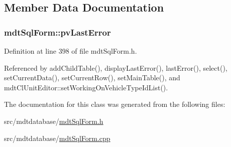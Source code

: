 \subsection{Member Data Documentation}
\hypertarget{classmdt_sql_form_afc24e8dedd1249a29708347fdff560fd}{
\subsubsection[{pv\-Last\-Error}]{ mdt\-Sql\-Form\-::pv\-Last\-Error\hspace{0.3cm}{\ttfamily [protected]}}}\label{classmdt_sql_form_afc24e8dedd1249a29708347fdff560fd}


Definition at line 398 of file mdt\-Sql\-Form.\-h.



Referenced by add\-Child\-Table(), display\-Last\-Error(), last\-Error(), select(), set\-Current\-Data(), set\-Current\-Row(), set\-Main\-Table(), and mdt\-Cl\-Unit\-Editor\-::set\-Working\-On\-Vehicle\-Type\-Id\-List().



The documentation for this class was generated from the following files\-:\begin{DoxyCompactItemize}
\item 
src/mdtdatabase/\hyperlink{mdt_sql_form_8h}{mdt\-Sql\-Form.\-h}\item 
src/mdtdatabase/\hyperlink{mdt_sql_form_8cpp}{mdt\-Sql\-Form.\-cpp}\end{DoxyCompactItemize}
